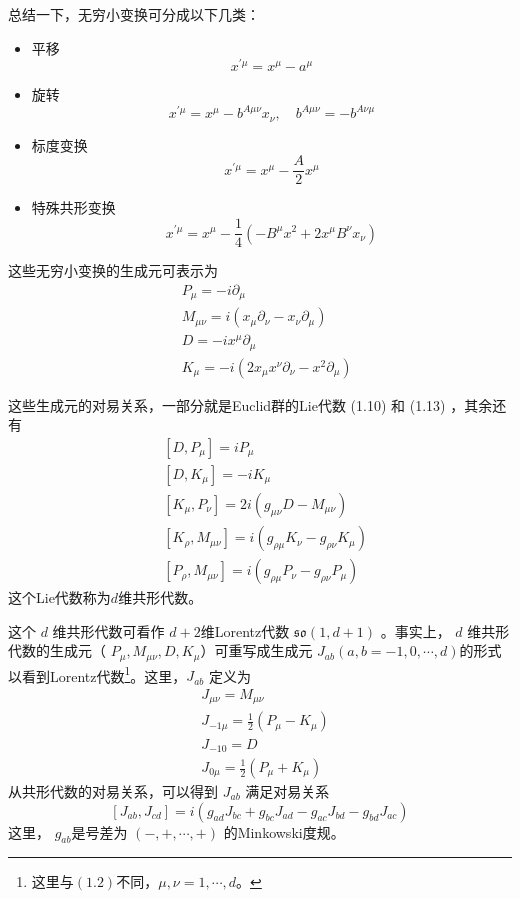 总结一下，无穷小变换可分成以下几类：
\begin{itemize}
	\item 平移
	\begin{equation}
		x^{\prime \mu}=x^{\mu}-a^{\mu}
	\end{equation}	
	\item 旋转
	\begin{equation}
		x^{\prime \mu}=x^{\mu}-b^{A \mu \nu} x_{\nu}, \quad b^{A \mu \nu}=-b^{A \nu \mu}
	\end{equation}
	\item 标度变换
	\begin{equation}
		x^{\prime \mu}=x^{\mu}-\frac{A}{2} x^{\mu}
	\end{equation}
	\item 特殊共形变换
	\begin{equation}
		x^{\prime \mu}=x^{\mu}-\frac{1}{4}\left(-B^{\mu} x^{2}+2 x^{\mu} B^{\nu} x_{\nu}\right)
	\end{equation}
\end{itemize}
这些无穷小变换的生成元可表示为
	\begin{align} &P_{\mu}=-i \partial_{\mu} \\ &M_{\mu \nu}=i\left(x_{\mu} \partial_{\nu}-x_{\nu} \partial_{\mu}\right) \\\ &D=-i x^{\mu} \partial_{\mu} \\ &K_{\mu}=-i\left(2 x_{\mu} x^{\nu} \partial_{\nu}-x^{2} \partial_{\mu}\right)  \end{align}

这些生成元的对易关系，一部分就是Euclid群的Lie代数 (1.10) 和 (1.13) ，其余还有
\begin{align} &\left[D, P_{\mu}\right]=i P_{\mu}\\ &\left[D, K_{\mu}\right]=-i K_{\mu} \\ &\left[K_{\mu}, P_{\nu}\right]=2 i\left(g_{\mu \nu} D-M_{\mu \nu}\right) \\ &\left[K_{\rho}, M_{\mu \nu}\right]=i\left(g_{\rho \mu} K_{\nu}-g_{\rho \nu} K_{\mu}\right) \\ &\left[P_{\rho}, M_{\mu \nu}\right]=i\left(g_{\rho \mu} P_{\nu}-g_{\rho \nu} P_{\mu}\right) 
\end{align}
这个Lie代数称为$ d $维共形代数。

这个 $d$ 维共形代数可看作 $d+2 $维Lorentz代数 $\mathfrak{so}(1,d+1)$ 。事实上， $d$ 维共形代数的生成元（ $P_{\mu}, M_{\mu \nu}, D, K_{\mu} $）可重写成生成元 $J_{ab} (a,b=-1,0,\cdots,d )$的形式以看到Lorentz代数\footnote{这里与$(1.2)$不同，$\mu,\nu=1, \cdots, d$。}。这里，$ J_{ab}$ 定义为
	\begin{align} &J_{\mu \nu}=M_{\mu \nu}\\ &J_{-1 \mu}=\frac{1}{2}\left(P_{\mu}-K_{\mu}\right) \\ &J_{-10}=D \\ &J_{0 \mu}=\frac{1}{2}\left(P_{\mu}+K_{\mu}\right)  \end{align}
从共形代数的对易关系，可以得到 $J_{ab}$ 满足对易关系
\begin{equation}
	\left[J_{a b}, J_{c d}\right]=i\left(g_{a d} J_{b c}+g_{b c} J_{a d}-g_{a c} J_{b d}-g_{b d} J_{a c}\right)
\end{equation}
这里， $g_{ab} $是号差为 $(-,+, \cdots,+)$ 的Minkowski度规。

